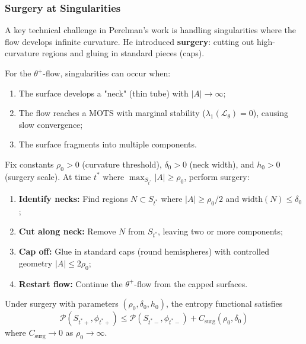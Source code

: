 \subsubsection{Surgery at Singularities}

A key technical challenge in Perelman's work is handling singularities where the flow develops infinite curvature. He introduced \textbf{surgery}: cutting out high-curvature regions and gluing in standard pieces (caps).

For the $\theta^+$-flow, singularities can occur when:
\begin{enumerate}[label=(\roman*)]
\item The surface develops a "neck" (thin tube) with $|A| \to \infty$;
\item The flow reaches a MOTS with marginal stability ($\lambda_1(\mathcal{L}_\theta) = 0$), causing slow convergence;
\item The surface fragments into multiple components.
\end{enumerate}

\begin{definition}
\label{def:surgery}
Fix constants $\rho_0 > 0$ (curvature threshold), $\delta_0 > 0$ (neck width), and $h_0 > 0$ (surgery scale). At time $t^*$ where $\max_{S_{t^*}} |A| \geq \rho_0$, perform surgery:
\begin{enumerate}[label=\textbf{S\arabic*}.]
\item \textbf{Identify necks:} Find regions $N \subset S_{t^*}$ where $|A| \geq \rho_0/2$ and $\mathrm{width}(N) \leq \delta_0$;
\item \textbf{Cut along neck:} Remove $N$ from $S_{t^*}$, leaving two or more components;
\item \textbf{Cap off:} Glue in standard caps (round hemispheres) with controlled geometry $|A| \leq 2\rho_0$;
\item \textbf{Restart flow:} Continue the $\theta^+$-flow from the capped surfaces.
\end{enumerate}
\end{definition}

\begin{theorem}
\label{thm:surgery-entropy}
Under surgery with parameters $(\rho_0, \delta_0, h_0)$, the entropy functional satisfies
\begin{equation}
\mathcal{P}(S_{t^*+}, \phi_{t^*+}) \leq \mathcal{P}(S_{t^*-}, \phi_{t^*-}) + C_{\mathrm{surg}}(\rho_0, \delta_0)
\end{equation}
where $C_{\mathrm{surg}} \to 0$ as $\rho_0 \to \infty$.
\end{theorem}

